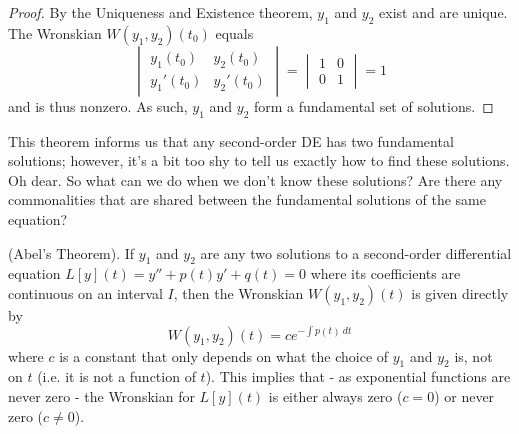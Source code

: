 \documentclass{article}
\begin{document}
\begin{proof}
    By the Uniqueness and Existence theorem, $y_1$ and $y_2$ exist and are unique. The Wronskian $W(y_1, y_2)(t_0)$ equals
    \begin{equation*}
        \begin{vmatrix}
            y_1(t_0) & y_2(t_0) \\
            y_1'(t_0) & y_2'(t_0)
        \end{vmatrix}
        = 
        \begin{vmatrix}
            1 & 0 \\
            0 & 1
        \end{vmatrix}
        =1
    \end{equation*}
    and is thus nonzero. As such, $y_1$ and $y_2$ form a fundamental set of solutions. 
\end{proof}
This theorem informs us that any second-order DE has two fundamental solutions; however, it's a bit too shy to tell us exactly how to find these solutions. Oh dear. So what can we do when we don't know these solutions? Are there any commonalities that are shared between the fundamental solutions of the same equation?
\begin{theorem}
    (Abel's Theorem). If $y_1$ and $y_2$ are any two solutions to a second-order differential equation $L[y](t) = y''+p(t)y'+q(t) = 0$ where its coefficients are continuous on an interval $I$, then the Wronskian $W(y_1,y_2)(t)$ is given directly by 
    \begin{equation*}
        W(y_1,y_2)(t) = ce^{-\int p(t)\ dt}
    \end{equation*}
    where $c$ is a constant that only depends on what the choice of $y_1$ and $y_2$ is, not on $t$ (i.e. it is not a function of $t$). This implies that - as exponential functions are never zero - the Wronskian for $L[y](t)$ is either always zero ($c=0$) or never zero ($c \neq 0$).
\end{theorem}
\end{document}
